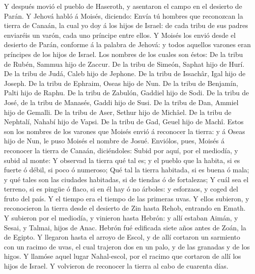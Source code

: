  Y después movió el pueblo de Haseroth, y asentaron el campo
en el desierto de Parán.  Y Jehová habló á Moisés, diciendo:
 Envía tú hombres que reconozcan la tierra de Canaán, la
cual yo doy á los hijos de Israel: de cada tribu de sus padres enviaréis
un varón, cada uno príncipe entre ellos.  Y Moisés los envió
desde el desierto de Parán, conforme á la palabra de Jehová: y todos
aquellos varones eran príncipes de los hijos de Israel.  Los
nombres de los cuales son éstos: De la tribu de Rubén, Sammua hijo de
Zaccur.  De la tribu de Simeón, Saphat hijo de Hurí.
 De la tribu de Judá, Caleb hijo de Jephone.  De
la tribu de Issachâr, Igal hijo de Joseph.  De la tribu de
Ephraim, Oseas hijo de Nun.  De la tribu de Benjamín, Palti
hijo de Raphu.  De la tribu de Zabulón, Gaddiel hijo de
Sodi.  De la tribu de José, de la tribu de Manasés, Gaddi
hijo de Susi.  De la tribu de Dan, Ammiel hijo de Gemalli.
 De la tribu de Aser, Sethur hijo de Michâel. 
De la tribu de Nephtalí, Nahabí hijo de Vapsi.  De la tribu
de Gad, Geuel hijo de Machî.  Estos son los nombres de los
varones que Moisés envió á reconocer la tierra: y á Oseas hijo de Nun,
le puso Moisés el nombre de Josué.  Enviólos, pues, Moisés
á reconocer la tierra de Canaán, diciéndoles: Subid por aquí, por el
mediodía, y subid al monte:  Y observad la tierra qué tal
es; y el pueblo que la habita, si es fuerte ó débil, si poco ó numeroso;
 Qué tal la tierra habitada, si es buena ó mala; y qué
tales son las ciudades habitadas, si de tiendas ó de fortalezas;
 Y cuál sea el terreno, si es pingüe ó flaco, si en él hay
ó no árboles: y esforzaos, y coged del fruto del país. Y el tiempo era
el tiempo de las primeras uvas.  Y ellos subieron, y
reconocieron la tierra desde el desierto de Zin hasta Rehob, entrando en
Emath.  Y subieron por el mediodía, y vinieron hasta
Hebrón: y allí estaban Aimán, y Sesai, y Talmai, hijos de Anac. Hebrón
fué edificada siete años antes de Zoán, la de Egipto.  Y
llegaron hasta el arroyo de Escol, y de allí cortaron un sarmiento con
un racimo de uvas, el cual trajeron dos en un palo, y de las granadas y
de los higos.  Y llamóse aquel lugar Nahal-escol, por el
racimo que cortaron de allí los hijos de Israel.  Y
volvieron de reconocer la tierra al cabo de cuarenta días. 
